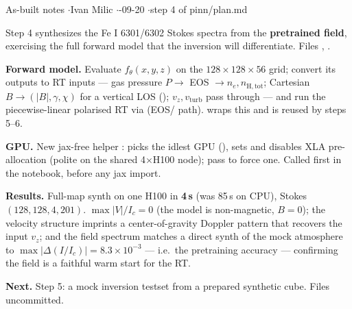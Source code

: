 


%
{As-built notes \quad$\cdot$\quad Ivan Milic \quad$\cdot$-09-20 \quad$\cdot$\quad step 4 of pinn/plan.md}

Step 4 synthesizes the Fe I 6301/6302 Stokes spectra from the \textbf{pretrained field}, exercising the full
forward model that the inversion will differentiate. Files ,
.

\textbf{Forward model.} Evaluate $f_\theta(x,y,z)$ on the $128\times128\times56$ grid; convert its outputs to
RT inputs --- gas pressure $P\to$ EOS $\to n_e,n_\mathrm{H,tot}$; Cartesian $B\to(|B|,\gamma,\chi)$ for a
vertical LOS (); $v_z,v_\mathrm{turb}$ pass through --- and run the piecewise-linear
polarised RT via  (EOS/ path).  wraps this and
is reused by steps 5--6.

\textbf{GPU.} New jax-free helper :  picks the idlest GPU
(), sets  and disables XLA pre-allocation (polite on the shared
4$\times$H100 node); pass  to force one. Called first in the notebook, before any jax import.

\textbf{Results.} Full-map synth on one H100 in \textbf{4\,s} (was 85\,s on CPU), Stokes $(128,128,4,201)$.
$\max|V|/I_c=0$ (the model is non-magnetic, $B{=}0$); the velocity structure imprints a center-of-gravity
Doppler pattern that recovers the input $v_z$; and the field spectrum matches a direct synth of the mock
atmosphere to $\max|\Delta(I/I_c)|=8.3\times10^{-3}$ --- i.e.\ the pretraining accuracy --- confirming the
field is a faithful warm start for the RT.

\textbf{Next.} Step 5: a mock inversion testset from a prepared synthetic cube. Files uncommitted.



